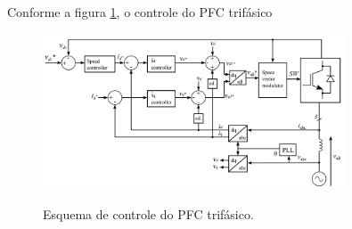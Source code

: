  Conforme a figura \ref{fig:controlepfc3ph}, o controle do PFC trifásico 

 \begin{figure}
 	\centering
	\caption{Esquema de controle do PFC trifásico.}
	\includegraphics[width=0.8\textwidth]{./Figuras/controlepfc3ph.png}
	\label{fig:controlepfc3ph}
 \end{figure}